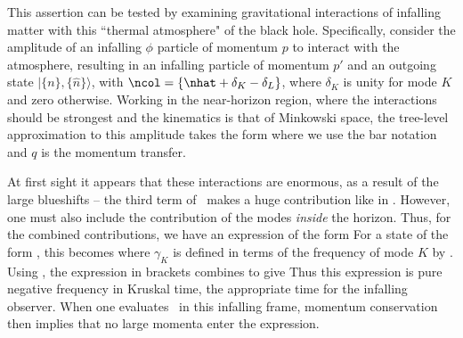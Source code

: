 
This assertion can be tested by examining gravitational interactions of infalling matter with this ``thermal atmosphere" of the black hole. Specifically, consider the amplitude of an infalling $\phi$ particle of momentum $p$ to interact with the atmosphere, resulting in an infalling particle of momentum $p'$ and an outgoing state $|\{n\},\{{\hat n}\}\rangle$, with $\ncol=\{\nhat +\delta_K-\delta_L\}$,  where $\delta_K$ is unity for mode $K$ and zero otherwise.    Working in the near-horizon region, where the interactions should be strongest and the kinematics is that of Minkowski space, the tree-level approximation to this amplitude takes the form
%
\eqn{}
%
where we use the bar notation
%
\eqn{}
%
and $q$ is the momentum transfer.

At first sight it appears that these interactions are enormous, as a result of the large blueshifts -- the third term of \fdstexp\ makes a huge contribution like in \fdT.  However, one must also include the contribution of the modes {\it inside} the horizon.  Thus, for the combined contributions, we have an expression of the form
%
\eqn{}
%
For a state of the form \prodH, this becomes 
%
\eqn{}
%
where $\gamma_K$ is defined in terms of the frequency of mode $K$ by \gammafd.
Using \vfd, the expression in brackets combines to give
%
\eqn{}
%
Thus this expression is pure negative frequency in Kruskal time, the appropriate time for the infalling observer.  When one evaluates \gravamp\ in this infalling frame, momentum conservation then implies that no large momenta enter the expression.



